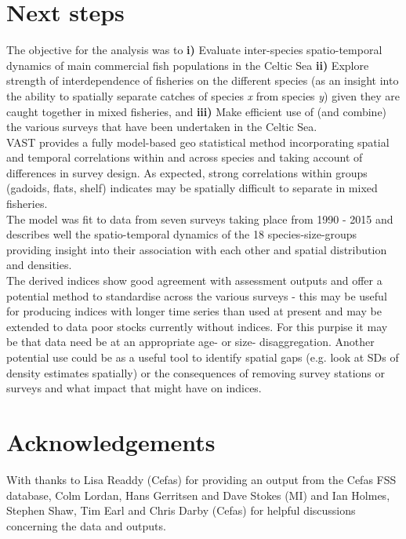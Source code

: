 \documentclass[11pt]{article}
\begin{document}
\section{Next steps}

The objective for the analysis was to \textbf{i)} Evaluate inter-species
spatio-temporal dynamics of main commercial fish populations in the Celtic Sea
\textbf{ii)} Explore strength of interdependence of fisheries on the different
species (as an insight into the ability to spatially separate catches of
species \textit{x} from species \textit{y}) given they are caught together in
mixed fisheries, and \textbf{iii)} Make efficient use of (and combine) the
various surveys that have been undertaken in the Celtic Sea. \\

VAST provides a fully model-based geo statistical method incorporating spatial
and temporal correlations within and across species and taking account of
differences in survey design. As expected, strong correlations within groups
(gadoids, flats, shelf) indicates may be spatially difficult to separate in
mixed fisheries. \\

The model was fit to data from seven surveys taking place from 1990 - 2015 and
describes well the spatio-temporal dynamics of the 18 species-size-groups
providing insight into their association with each other and spatial
distribution and densities. \\

The derived indices show good agreement with assessment outputs and offer a
potential method to standardise across the various surveys - this may be useful
for producing indices with longer time series than used at present and may be
extended to data poor stocks currently without indices. For this purpise it may
be that data need be at an appropriate age- or size- disaggregation. Another
potential use could be as a useful tool to identify spatial gaps (e.g. look at
SDs of density estimates spatially) or the consequences of removing survey
stations or surveys and what impact that might have on indices.

\section{Acknowledgements}

With thanks to Lisa Readdy (Cefas) for providing an output from the Cefas FSS
database, Colm Lordan, Hans Gerritsen and Dave Stokes (MI) and Ian Holmes,
Stephen Shaw, Tim Earl and Chris Darby (Cefas) for helpful discussions
concerning the data and outputs.

\newpage

\small{}

\end{document}
